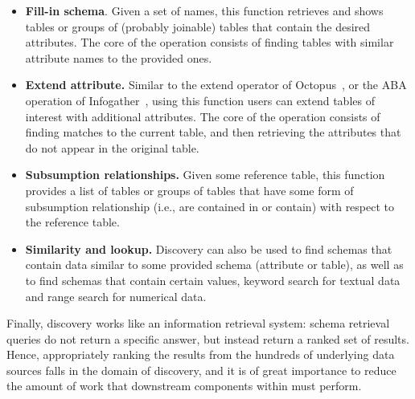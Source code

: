 \begin{itemize}
\item \textbf{Fill-in schema}. Given a set of names, this function
retrieves and shows tables or groups of (probably joinable) tables that contain
the desired attributes. The core of the operation consists of finding tables
with similar attribute names to the provided ones.

\item \textbf{Extend attribute.} Similar to the extend operator of Octopus~\cite{octopus}, or the ABA operation of Infogather~\cite{DBLP:conf/sigmod/YakoutGCC12}, using this function users
can extend tables of interest with additional attributes. The
core of the operation consists of finding matches to the current table, and then
retrieving the attributes that do not appear in the original table.

\item \textbf{Subsumption relationships.} Given some reference table,
this function provides a list of tables or groups of tables that have some form
of subsumption relationship (i.e., are contained in or contain) with respect to the reference table. 

\item \textbf{Similarity and lookup.} Discovery can also be used to find schemas
that contain data similar to some provided schema (attribute or table), as well
as to find schemas that contain certain values, \ie keyword search for
textual data and range search for numerical data.
\end{itemize}

Finally, discovery works like an information retrieval system: schema retrieval queries
do not return a specific answer, but instead return a ranked set of results.
Hence,  appropriately ranking the results from the hundreds of underlying data
sources falls in the domain of discovery, and it is of great importance to reduce
the amount of work that downstream components  within \dcv must perform. 

